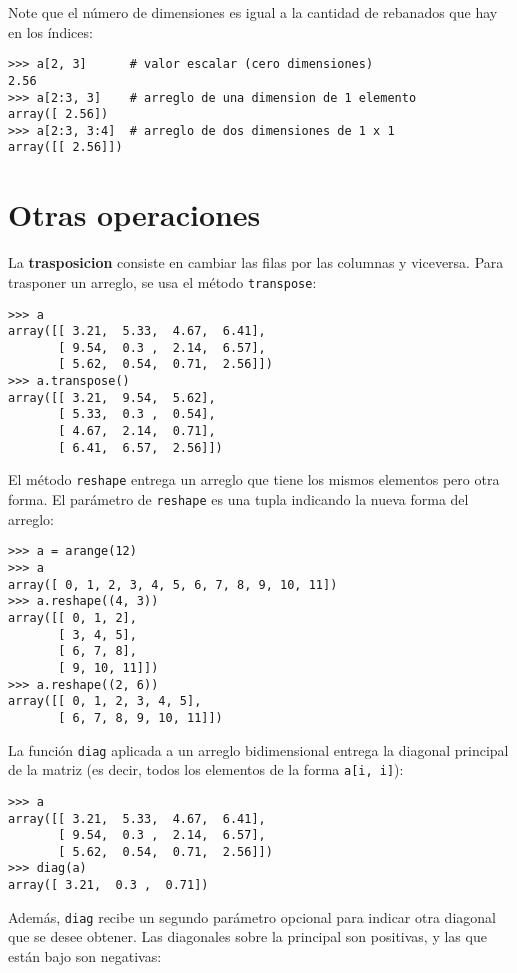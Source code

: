 Note que el número de dimensiones es igual a la cantidad de rebanados
que hay en los índices:

\begin{lstlisting}
>>> a[2, 3]      # valor escalar (cero dimensiones)
2.56
>>> a[2:3, 3]    # arreglo de una dimension de 1 elemento
array([ 2.56])
>>> a[2:3, 3:4]  # arreglo de dos dimensiones de 1 x 1
array([[ 2.56]])
\end{lstlisting}

\section{Otras operaciones}

La \textbf{trasposicion} consiste en cambiar las filas por las columnas
y viceversa. Para trasponer un arreglo, se usa el método
\lstinline!transpose!:

\begin{lstlisting}
>>> a
array([[ 3.21,  5.33,  4.67,  6.41],
       [ 9.54,  0.3 ,  2.14,  6.57],
       [ 5.62,  0.54,  0.71,  2.56]])
>>> a.transpose()
array([[ 3.21,  9.54,  5.62],
       [ 5.33,  0.3 ,  0.54],
       [ 4.67,  2.14,  0.71],
       [ 6.41,  6.57,  2.56]])
\end{lstlisting}

El método \lstinline!reshape! entrega un arreglo que tiene los mismos
elementos pero otra forma. El parámetro de \lstinline!reshape! es una
tupla indicando la nueva forma del arreglo:

\begin{lstlisting}
>>> a = arange(12)
>>> a
array([ 0, 1, 2, 3, 4, 5, 6, 7, 8, 9, 10, 11])
>>> a.reshape((4, 3))
array([[ 0, 1, 2],
       [ 3, 4, 5],
       [ 6, 7, 8],
       [ 9, 10, 11]])
>>> a.reshape((2, 6))
array([[ 0, 1, 2, 3, 4, 5],
       [ 6, 7, 8, 9, 10, 11]])
\end{lstlisting}

La función \lstinline!diag! aplicada a un arreglo bidimensional entrega
la diagonal principal de la matriz (es decir, todos los elementos de la
forma \lstinline!a[i, i]!):

\begin{lstlisting}
>>> a
array([[ 3.21,  5.33,  4.67,  6.41],
       [ 9.54,  0.3 ,  2.14,  6.57],
       [ 5.62,  0.54,  0.71,  2.56]])
>>> diag(a)
array([ 3.21,  0.3 ,  0.71])
\end{lstlisting}

Además, \lstinline!diag! recibe un segundo parámetro opcional para
indicar otra diagonal que se desee obtener. Las diagonales sobre la
principal son positivas, y las que están bajo son negativas:

